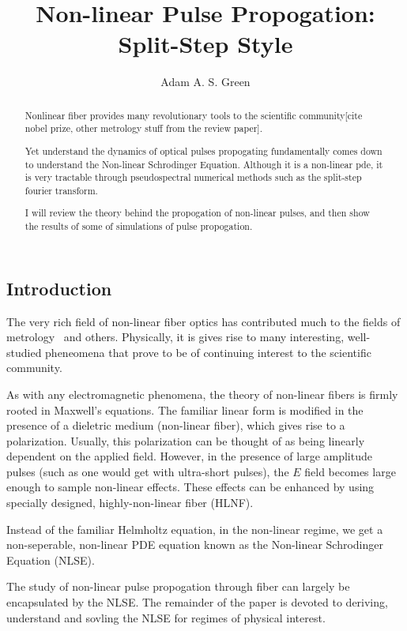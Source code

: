 \documentclass[12pt, titlepage]{article}
\title{Non-linear Pulse Propogation: Split-Step Style}
\author{Adam A. S. Green}
\begin{document}
\begin{spacing}{1.1}

\maketitle
\begin{abstract}
Nonlinear fiber provides many revolutionary tools to the scientific community[cite nobel prize, other metrology stuff from the review paper]\cite{dudrev}.

Yet understand the dynamics of optical pulses propogating fundamentally comes down to understand the Non-linear Schrodinger Equation. Although it is a non-linear pde, it is very tractable through pseudospectral numerical methods such as the split-step fourier transform\cite{gorovind}.

I will review the theory behind the propogation of non-linear pulses, and then show the results of some of simulations of pulse propogation. 

\end{abstract}

\section{Introduction}
\label{sec:intro}

The very rich field of non-linear fiber optics has contributed much to the fields of metrology~\cite{dudrev} and others.
Physically, it is gives rise to many interesting, well-studied pheneomena that prove to be of continuing interest to the scientific community.\cite{dudrev,zhu}

As with any electromagnetic phenomena, the theory of non-linear fibers is firmly rooted in Maxwell's equations. The familiar linear form is modified in the presence of a dieletric medium (non-linear fiber), which gives rise to a polarization. Usually, this polarization can be thought of as being linearly dependent on the applied field. However, in the presence of large amplitude pulses (such as one would get with ultra-short pulses), the $E$ field becomes large enough to
sample non-linear effects. 
These effects can be enhanced by using specially designed, highly-non-linear fiber (HLNF).

Instead of the familiar Helmholtz equation, in the non-linear regime, we get a non-seperable, non-linear PDE equation known as the Non-linear Schrodinger Equation (NLSE).

The study of non-linear pulse propogation through fiber can largely
be encapsulated by the NLSE. The remainder of the paper is devoted to deriving, understand and sovling the NLSE for regimes of physical interest.


\end{spacing}
\end{document}

